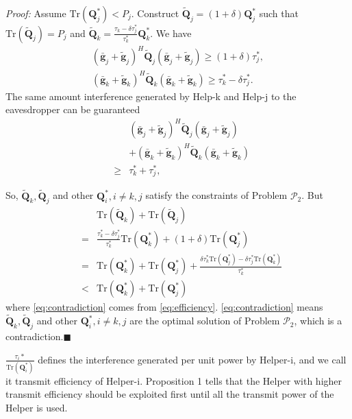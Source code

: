 \documentclass[conference]{IEEEtran}
\begin{document}
\emph{Proof:} Assume $\mathrm{Tr}(\mathbf{Q}_j^*) < P_j$. Construct $\tilde{\mathbf{Q}}_j = (1 + \delta) \mathbf{Q}_j^*$ such that $\mathrm{Tr}(\tilde{\mathbf{Q}}_j) = P_j$ and $\tilde{\mathbf{Q}}_k = \frac{\tau_k - \delta\tau_j^*}{\tau_k^*} \mathbf{Q}_k^*$. We have
\begin{eqnarray}
(\bar{\mathbf{g}}_j+\tilde{\mathbf{g}}_j)^H\tilde{\mathbf{Q}}_j(\bar{\mathbf{g}}_j+\tilde{\mathbf{g}}_j)\geq (1+ \delta)\tau_j^*,\\
(\bar{\mathbf{g}}_k+\tilde{\mathbf{g}}_k)^H\tilde{\mathbf{Q}}_k(\bar{\mathbf{g}}_k+\tilde{\mathbf{g}}_k) \geq \tau_k^* - \delta\tau_j^*.
\end{eqnarray}
The same amount interference generated by Help-k and Help-j to the eavesdropper can be guaranteed
\begin{eqnarray}
&&(\bar{\mathbf{g}}_j+\tilde{\mathbf{g}}_j)^H\tilde{\mathbf{Q}}_j(\bar{\mathbf{g}}_j+\tilde{\mathbf{g}}_j) \nonumber\\
&&+ (\bar{\mathbf{g}}_k+\tilde{\mathbf{g}}_k)^H\tilde{\mathbf{Q}}_k(\bar{\mathbf{g}}_k+\tilde{\mathbf{g}}_k)\nonumber\\
&\geq&  \tau_k^* + \tau_j^*,
\end{eqnarray}

So, $\tilde{\mathbf{Q}}_k, \tilde{\mathbf{Q}}_j$ and other $\mathbf{Q}_i^*, i \neq k,j$ satisfy the constraints of Problem $\mathcal{P}_2$. But
\begin{eqnarray}
&&\mathrm{Tr}(\tilde{\mathbf{Q}}_k) + \mathrm{Tr}(\tilde{\mathbf{Q}}_j)\\
&=&\frac{\tau_k^* - \delta\tau_j^*}{\tau_k^*} \mathrm{Tr}(\mathbf{Q}_k^*)  + (1 + \delta)\mathrm{Tr}(\mathbf{Q}_j^*)\\
&=&\mathrm{Tr}(\mathbf{Q}_k^*) + \mathrm{Tr}(\mathbf{Q}_j^*) + \frac{\delta\tau_k^*\mathrm{Tr}(\mathbf{Q}_j^*)-\delta\tau_j^*\mathrm{Tr}(\mathbf{Q}_k^*)}{\tau_k^*}\\
&<&\mathrm{Tr}(\mathbf{Q}_k^*) + \mathrm{Tr}(\mathbf{Q}_j^*) \label{eq:contradiction}
\end{eqnarray}
where \eqref{eq:contradiction} comes from  \eqref{eq:efficiency}.
\eqref{eq:contradiction} means $\tilde{\mathbf{Q}}_k, \tilde{\mathbf{Q}}_j$ and other $\mathbf{Q}_i^*, i \neq k,j$ are the optimal solution of Problem $\mathcal{P}_2$, which is a contradiction.$\blacksquare$

$\frac{\tau_i*}{\mathrm{Tr}(\mathbf{Q}_i^*)}$ defines the interference generated per unit power by Helper-i, and we call it transmit efficiency of Helper-i. Proposition 1 tells that the Helper with higher transmit efficiency should be exploited first until all the transmit power of the Helper is used.
\end{document}
